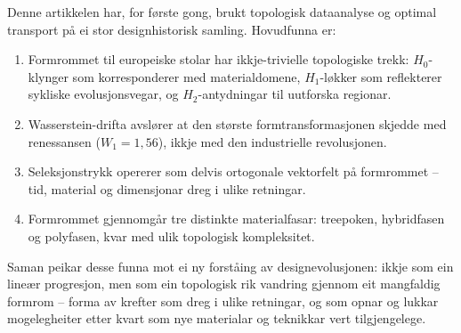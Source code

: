 \documentclass[10pt, a4paper, twocolumn]{article}
\begin{document}
Denne artikkelen har, for f\o rste gong, brukt topologisk dataanalyse og optimal transport p\aa{} ei stor designhistorisk samling. Hovudfunna er:

\begin{enumerate}
  \item Formrommet til europeiske stolar har ikkje-trivielle topologiske trekk: $H_0$-klynger som korresponderer med materialdomene, $H_1$-l\o kker som reflekterer sykliske evolusjonsvegar, og $H_2$-antydningar til uutforska regionar.
  \item Wasserstein-drifta avsl\o rer at den st\o rste formtransformasjonen skjedde med renessansen ($W_1 = 1{,}56$), ikkje med den industrielle revolusjonen.
  \item Seleksjonstrykk opererer som delvis ortogonale vektorfelt p\aa{} formrommet -- tid, material og dimensjonar dreg i ulike retningar.
  \item Formrommet gjennomg\aa r tre distinkte materialfasar: treepoken, hybridfasen og polyfasen, kvar med ulik topologisk kompleksitet.
\end{enumerate}

Saman peikar desse funna mot ei ny forst\aa ing av designevolusjonen: ikkje som ein line\ae r progresjon, men som ein topologisk rik vandring gjennom eit mangfaldig formrom -- forma av krefter som dreg i ulike retningar, og som opnar og lukkar mogelegheiter etter kvart som nye materialar og teknikkar vert tilgjengelege.




\end{document}
